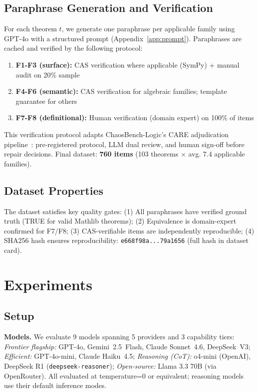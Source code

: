\documentclass{article}
\begin{document}
\subsection{Paraphrase Generation and Verification}

For each theorem $t$, we generate one paraphrase per applicable family using GPT-4o
with a structured prompt (Appendix~\ref{app:prompt}).
Paraphrases are cached and verified by the following protocol:

\begin{enumerate}[leftmargin=*,itemsep=2pt]
\item \textbf{F1-F3 (surface):} CAS verification where applicable (SymPy) + manual audit on 20\% sample
\item \textbf{F4-F6 (semantic):} CAS verification for algebraic families; template guarantee for others
\item \textbf{F7-F8 (definitional):} Human verification (domain expert) on 100\% of items
\end{enumerate}

This verification protocol adapts ChaosBench-Logic's CARE adjudication pipeline~\citep{chaosbench2026}: pre-registered protocol, LLM dual review, and human sign-off before repair decisions.
Final dataset: \textbf{760 items} (103 theorems $\times$ avg. 7.4 applicable families).

\subsection{Dataset Properties}

The dataset satisfies key quality gates:
(1) All paraphrases have verified ground truth (TRUE for valid Mathlib theorems);
(2) Equivalence is domain-expert confirmed for F7/F8;
(3) CAS-verifiable items are independently reproducible;
(4) SHA256 hash ensures reproducibility: \texttt{e668f98a...79a1656} (full hash in dataset card).

\section{Experiments}
\label{sec:experiments}

\subsection{Setup}

\textbf{Models.} We evaluate 9 models spanning 5 providers and 3 capability tiers:
\emph{Frontier flagship:} GPT-4o, Gemini~2.5~Flash, Claude Sonnet~4.6, DeepSeek~V3;
\emph{Efficient:} GPT-4o-mini, Claude Haiku~4.5;
\emph{Reasoning (CoT):} o4-mini (OpenAI), DeepSeek R1 (\texttt{deepseek-reasoner});
\emph{Open-source:} Llama 3.3 70B (via OpenRouter).
All evaluated at temperature=0 or equivalent; reasoning models use their default inference modes.
\end{document}
